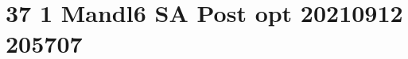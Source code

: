 \documentclass[crop=false]{standalone}
\begin{document}

\section{37 1 Mandl6 SA Post opt 20210912 205707}
\end{document}
